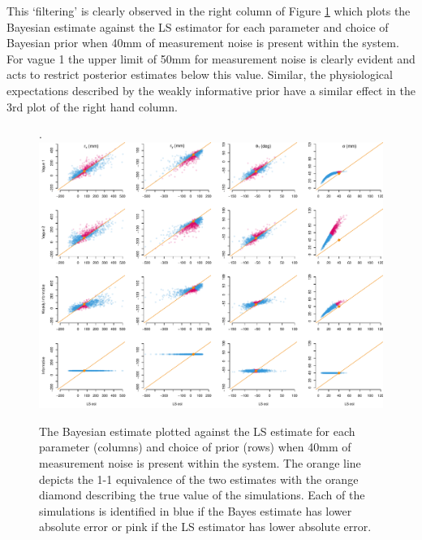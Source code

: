 \documentclass{article}
\begin{document}
This `filtering' is clearly observed in the right column of Figure \ref{fig:Error40scatter} which plots the Bayesian estimate against the LS estimator for each parameter and choice of Bayesian prior when 40\si{\milli\meter} of measurement noise is present within the system.  For vague 1 the upper limit of 50\si{\milli\meter} for measurement noise is clearly evident and acts to restrict posterior estimates below this value.  Similar, the physiological expectations described by the weakly informative prior have a similar effect in the 3rd plot of the right hand column.  
\begin{figure}.
	\centering
	\includegraphics[width = \linewidth]{./Figures/Error40Scatter}
	\caption{The Bayesian estimate plotted against the LS estimate for each parameter (columns) and choice of prior (rows) when 40\si{\milli\meter} of measurement noise is present within the system.  The orange line depicts the 1-1 equivalence of the two estimates with the orange diamond describing the true value of the simulations.  Each of the simulations is identified in blue if the Bayes estimate has lower absolute error or pink if the LS estimator has lower absolute error.}
	\label{fig:Error40scatter}
\end{figure}
\end{document}
